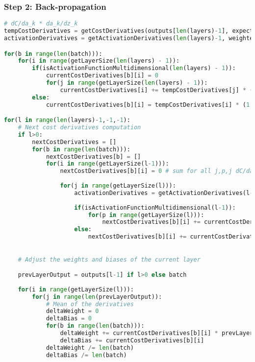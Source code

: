\documentclass[11pt,a4paper]{report}
\begin{document}
\subsubsection{Step 2: Back-propagation}
\begin{lstlisting}[language=Python]
# dC/da_k * da_k/dz_k
tempCostDerivatives = getCostDerivatives(outputs[len(layers)-1], expectedOutput, len(batch)) # Matrix of dC/da_j for all batch item and for all j
activationDerivatives = getActivationDerivatives(len(layers)-1, weightedSums[getNbLayers()-1], len(batch)) # Tensor of order 3 of da_j/dz_i for all batch item and for all j,i

for(b in range(len(batch))):
    for(i in range(getLayerSize(len(layers) - 1)):
        if(isActivationFunctionMultidimensional(len(layers) - 1)):
            currentCostDerivatives[b][i] = 0
            for(j in range(getLayerSize(len(layers) - 1)):
                currentCostDerivatives[i] += tempCostDerivatives[j] * (1.0f/getLayerSize(len(layers) - 1) * activationDerivatives[b][j][i]
        else:
            currentCostDerivatives[b][i] = tempCostDerivatives[i] * (1.0f/getLayerSize(len(layers) - 1) * activationDerivatives[b][0][i]

for(l in range(len(layers)-1,-1,-1):
    # Next cost derivatives computation
    if l>0:
        nextCostDerivatives = []
        for(b in range(len(batch))):
            nextCostDerivatives[b] = []
            for(i in range(getLayerSize(l-1))):
                nextCostDerivatives[b][i] = 0 # sum for all j,p,j dC/da_k * da_k/dz_p * dz_p/da_j * da_j/dz_i
                
                for(j in range(getLayerSize(l))):
                    activationDerivatives = getActivationDerivatives(l-1, weightedSums[l-1]) # matrix of da_j/dz_i for all j and all i
    
                    if(isActivationFunctionMultidimensional(l-1)):
                        for(p in range(getLayerSize(l))):
                            nextCostDerivatives[b][i] += currentCostDerivatives[b][p] * getWeight(l,p,j) * activationDerivatives[j][i]
                    else:
                        nextCostDerivatives[b][i] += currentCostDerivatives[b][j] * getWeight(l,p,i) * activationDerivatives[0][i]
                

    # Adjust the weights and biases of the current layer

    prevLayerOutput = outputs[l-1] if l>0 else batch
    
    for(i in range(getLayerSize(l))):
        for(j in range(len(prevLayerOutput)):
            # Mean of the derivatives
            deltaWeight = 0
            deltaBias = 0
            for(b in range(len(batch))):
                deltaWeight += currentCostDerivatives[b][i] * prevLayerOutput[b][j]
                deltaBias += currentCostDerivatives[b][i]
            deltaWeight /= len(batch)
            deltaBias /= len(batch)


\end{lstlisting}
\end{document}
